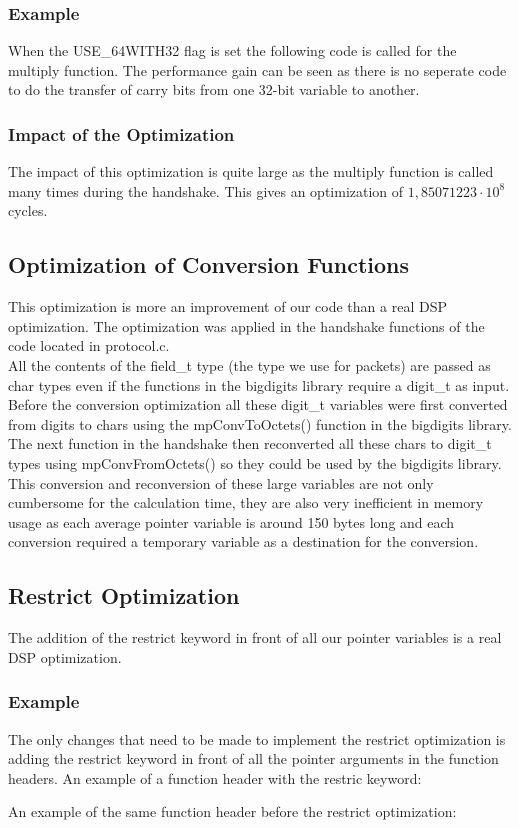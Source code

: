 \documentclass[a4paper]{article}
\begin{document}
	\subsubsection{Example}
		When the USE\_64WITH32 flag is set the following code is called for the multiply function. The performance gain can be seen as there is no seperate code to do the transfer of carry bits from one 32-bit variable to another.
		
	\subsubsection{Impact of the Optimization}
		The impact of this optimization is quite large as the multiply function is called many times during the handshake. This gives an optimization of $1,85071223\cdot10^{8}$ cycles.
\subsection{Optimization of Conversion Functions}
	This optimization is more an improvement of our code than a real DSP optimization. The optimization was applied in the handshake functions of the code located in protocol.c.\\
	
	All the contents of the field\_t type (the type we use for packets) are passed as char types even if the functions in the bigdigits library require a digit\_t as input. Before the conversion optimization all these digit\_t variables were first converted from digits to chars using the mpConvToOctets() function in the bigdigits library. The next function in the handshake then reconverted all these chars to digit\_t types using mpConvFromOctets() so they could be used by the bigdigits library.\\
	
	This conversion and reconversion of these large variables are not only cumbersome for the calculation time, they are also very inefficient in memory usage as each average pointer variable is around 150 bytes long and each conversion required a temporary variable as a destination for the conversion.\\
	
	
\subsection{Restrict Optimization}
	The addition of the restrict keyword in front of all our pointer variables is a real DSP optimization.
	\subsubsection{Example}
		The only changes that need to be made to implement the restrict optimization is adding the restrict keyword in front of all the pointer arguments in the function headers. An example of a function header with the restric keyword:
		
		An example of the same function header before the restrict optimization:
		
\end{document}
